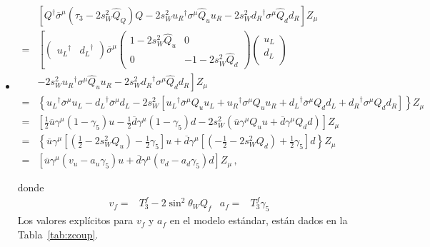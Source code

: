 \begin{frame}
\begin{itemize}
\item
  \begin{align}
\label{eq:zf4}
    &\left[ Q^{\dagger}\overline{\sigma}^\mu\left( \tau_3-2s_W^2\widehat{Q}_Q\right)Q
      -2s_W^2{u_R}^{\dagger}\sigma^\mu\widehat{Q}_u u_R-2s_W^2{d_R}^{\dagger}\sigma^\mu\widehat{Q}_d d_R\right]Z_\mu\nonumber\\
=&\left[\begin{pmatrix}
      {u_L}^{\dagger} &{d_L}^{\dagger}
    \end{pmatrix}\overline{\sigma}^\mu
    \begin{pmatrix}
      1-2s_W^2\widehat{Q}_u & 0\\
      0 &-1-2s_W^2\widehat{Q}_d
    \end{pmatrix}
    \begin{pmatrix}
      u_L\\
      d_L\\
    \end{pmatrix}\right.\nonumber\\
    &\left.-2s_W^2{u_R}^{\dagger}\sigma^\mu\widehat{Q}_u u_R-2s_W^2{d_R}^{\dagger}\sigma^\mu\widehat{Q}_d d_R
  \right]Z_\mu\nonumber\\
    =&\left\{{u_L}^{\dagger}\overline{\sigma}^\mu u_L-{d_L}^{\dagger}\overline{\sigma}^\mu d_L
-2s_W^2\left[{u_L}^{\dagger}\overline{\sigma}^{\mu}Q_u u_L+{u_R}^{\dagger}\sigma^\mu Q_uu_R
+{d_L}^{\dagger}\overline{\sigma}^{\mu}Q_d d_L+{d_R}^{\dagger}\sigma^\mu Q_dd_R
\right]\right\}Z_\mu \nonumber\\
          =&\left[\frac{1}{2}\overline{u}\gamma^\mu(1-\gamma_5)u-\frac{1}{2}\overline{d}\gamma^\mu(1-\gamma_5)d
-2s_W^2\left(\overline{u}\gamma^\mu Q_u u
+\overline{d}\gamma^\mu Q_d d
\right)\right]Z_\mu\nonumber\\
        =&\left\{\overline{u}\gamma^\mu\left[\left(\frac{1}{2}-2s_W^2Q_u\right)-\frac{1}{2}\gamma_5\right]u+
\overline{d}\gamma^\mu\left[\left(-\frac{1}{2}-2s_W^2Q_d\right)+\frac{1}{2}\gamma_5\right]d
\right\}Z_\mu\nonumber\\
  =&\left[\overline{u}\gamma^\mu\left(v_u-a_u\gamma_5\right)u+\overline{d}\gamma^\mu\left(v_d-a_d\gamma_5\right)d\right]Z_\mu\,,
\end{align}

donde
\begin{align}
  v_f=&T_3^f-2 \sin^2\theta_WQ_f & a_f=&T_3^f \gamma_5
\end{align}
Los valores explícitos para  $v_f$ y $a_f$ en el modelo estándar, están dados en la Tabla~\ref{tab:zcoup}. 
\end{itemize}



\end{frame}
